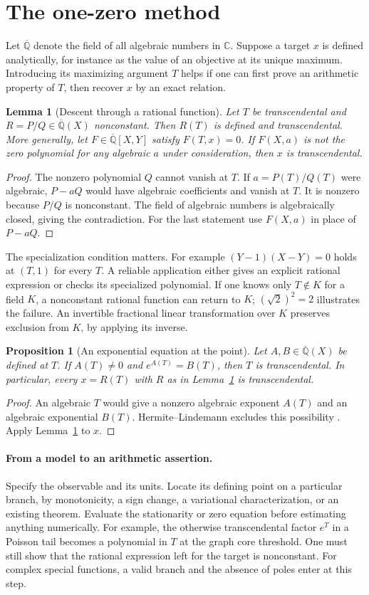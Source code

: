 \documentclass[11pt,a4paper]{article}
\newtheorem{lemma}[theorem]{Lemma}
\newtheorem{proposition}[theorem]{Proposition}
\theoremstyle{definition}
\theoremstyle{remark}
\begin{document}
\section{The one-zero method}\label{sec:method}
Let $\overline{\mathbb Q}$ denote the field of all algebraic numbers in $\mathbb C$. Suppose a target $x$ is defined analytically, for instance as the value of an objective at its unique maximum. Introducing its maximizing argument $T$ helps if one can first prove an arithmetic property of $T$, then recover $x$ by an exact relation.
\begin{lemma}[Descent through a rational function]\label{lem:descent}
Let $T$ be transcendental and $R=P/Q\in\overline{\mathbb Q}(X)$ nonconstant. Then $R(T)$ is defined and transcendental. More generally, let $F\in\overline{\mathbb Q}[X,Y]$ satisfy $F(T,x)=0$. If $F(X,a)$ is not the zero polynomial for any algebraic $a$ under consideration, then $x$ is transcendental.
\end{lemma}
\begin{proof}
The nonzero polynomial $Q$ cannot vanish at $T$. If $a=P(T)/Q(T)$ were algebraic, $P-aQ$ would have algebraic coefficients and vanish at $T$. It is nonzero because $P/Q$ is nonconstant. The field of algebraic numbers is algebraically closed, giving the contradiction. For the last statement use $F(X,a)$ in place of $P-aQ$.
\end{proof}
The specialization condition matters. For example $(Y-1)(X-Y)=0$ holds at $(T,1)$ for every $T$. A reliable application either gives an explicit rational expression or checks its specialized polynomial. If one knows only $T\notin K$ for a field $K$, a nonconstant rational function can return to $K$; $(\sqrt2)^2=2$ illustrates the failure. An invertible fractional linear transformation over $K$ preserves exclusion from $K$, by applying its inverse.
\begin{proposition}[An exponential equation at the point]\label{prop:mechanism}
Let $A,B\in\overline{\mathbb Q}(X)$ be defined at $T$. If $A(T)\ne0$ and $e^{A(T)}=B(T)$, then $T$ is transcendental. In particular, every $x=R(T)$ with $R$ as in Lemma~\ref{lem:descent} is transcendental.
\end{proposition}
\begin{proof}
An algebraic $T$ would give a nonzero algebraic exponent $A(T)$ and an algebraic exponential $B(T)$. Hermite--Lindemann excludes this possibility \cite{aSiegel}. Apply Lemma~\ref{lem:descent} to $x$.
\end{proof}
\paragraph{From a model to an arithmetic assertion.}
Specify the observable and its units. Locate its defining point on a particular branch, by monotonicity, a sign change, a variational characterization, or an existing theorem. Evaluate the stationarity or zero equation before estimating anything numerically. For example, the otherwise transcendental factor $e^T$ in a Poisson tail becomes a polynomial in $T$ at the graph core threshold. One must still show that the rational expression left for the target is nonconstant. For complex special functions, a valid branch and the absence of poles enter at this step.
\end{document}

